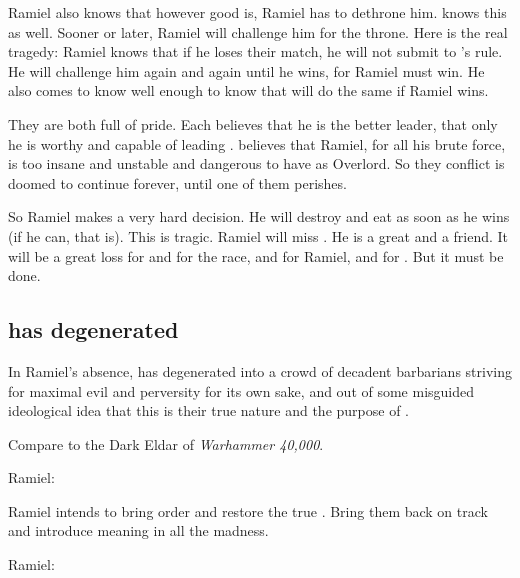 Ramiel also knows that however good \Dasteron is, Ramiel has to dethrone him.
\Dasteron knows this as well.
Sooner or later, Ramiel will challenge him for the throne.
Here is the real tragedy:
Ramiel knows that if he loses their match, he will not submit to \Dasteron's rule.
He will challenge him again and again until he wins, for Ramiel must win.
He also comes to know \Dasteron well enough to know that \Dasteron will do the same if Ramiel wins.

They are both full of pride.
Each believes that he is the better leader, that only he is worthy and capable of leading \Mystraacht.
\Dasteron believes that Ramiel, for all his brute force, is too insane and unstable and dangerous to have as Overlord.
So they conflict is doomed to continue forever, until one of them perishes.

So Ramiel makes a very hard decision.
He will destroy and eat \Dasteron as soon as he wins (if he can, that is). 
This is tragic.
Ramiel will miss \Dasteron.
He is a great \resphan and a friend.
It will be a great loss for \Mystraacht and for the \resphan race, and for Ramiel, and for \Cishiel.
But it must be done.










\subsection[Mystraacht has degenerated]{\Mystraacht has degenerated}
In Ramiel's absence, \Mystraacht{} has degenerated into a crowd of decadent barbarians striving for maximal evil and perversity for its own sake, and out of some misguided ideological idea that this is their true nature and the purpose of \Mystraacht. 

Compare to the Dark Eldar of \emph{Warhammer 40,000}.

Ramiel: 

Ramiel intends to bring order and restore the true \Mystraacht. 
Bring them back on track and introduce meaning in all the madness. 

Ramiel: 

